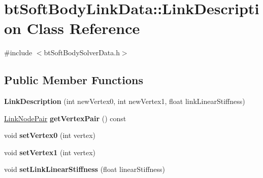 \hypertarget{classbt_soft_body_link_data_1_1_link_description}{\section{bt\+Soft\+Body\+Link\+Data\+:\+:Link\+Description Class Reference}
\label{classbt_soft_body_link_data_1_1_link_description}
}


{\ttfamily \#include $<$bt\+Soft\+Body\+Solver\+Data.\+h$>$}

\subsection*{Public Member Functions}
\begin{DoxyCompactItemize}
\item 
\hypertarget{classbt_soft_body_link_data_1_1_link_description_ac136d09840b27f48ada71f5974add5f8}{{\bfseries Link\+Description} (int new\+Vertex0, int new\+Vertex1, float link\+Linear\+Stiffness)}\label{classbt_soft_body_link_data_1_1_link_description_ac136d09840b27f48ada71f5974add5f8}

\item 
\hypertarget{classbt_soft_body_link_data_1_1_link_description_a40272c122ab605d112d9bbdc2a51b9e8}{\hyperlink{classbt_soft_body_link_data_1_1_link_node_pair}{Link\+Node\+Pair} {\bfseries get\+Vertex\+Pair} () const }\label{classbt_soft_body_link_data_1_1_link_description_a40272c122ab605d112d9bbdc2a51b9e8}

\item 
\hypertarget{classbt_soft_body_link_data_1_1_link_description_ab3749f46658d57ce5a6cd805b0a65051}{void {\bfseries set\+Vertex0} (int vertex)}\label{classbt_soft_body_link_data_1_1_link_description_ab3749f46658d57ce5a6cd805b0a65051}

\item 
\hypertarget{classbt_soft_body_link_data_1_1_link_description_ac18b22edeb1c83f3e8e11f5671ae6b28}{void {\bfseries set\+Vertex1} (int vertex)}\label{classbt_soft_body_link_data_1_1_link_description_ac18b22edeb1c83f3e8e11f5671ae6b28}

\item 
\hypertarget{classbt_soft_body_link_data_1_1_link_description_aa3b2478b69b3baa1ea31c0523899bc0b}{void {\bfseries set\+Link\+Linear\+Stiffness} (float linear\+Stiffness)}\label{classbt_soft_body_link_data_1_1_link_description_aa3b2478b69b3baa1ea31c0523899bc0b}


\end{DoxyCompactItemize}
